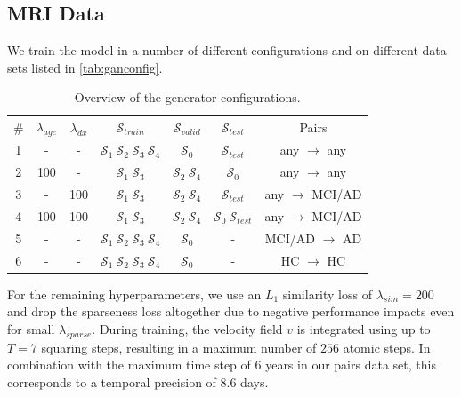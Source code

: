 \subsection{MRI Data} %

We train the model in a number of different configurations and on different data sets listed in \autoref{tab:ganconfig}.

\begin{table}[h]
	\begin{center}
		\begin{tabular}{c c c c c c c}
			\toprule
			\# & $\lambda_{age}$ & $\lambda_{dx}$ &
				$\mathcal{S}_{train}$ & $\mathcal{S}_{valid}$ & $\mathcal{S}_{test}$ & Pairs \\
			\cmidrule(lr){1-7}
			1 &  -  &  -  & $\mathcal{S}_1\:\mathcal{S}_2\:\mathcal{S}_3\:\mathcal{S}_4$ &
				      $\mathcal{S}_0$ &
				      $\mathcal{S}_{test}$ &
				      \footnotesize any $\rightarrow$ any \\
			2 & 100 &  -  & $\mathcal{S}_1\:\mathcal{S}_3$ & 
				      $\mathcal{S}_2\:\mathcal{S}_4$ &
				      $\mathcal{S}_0$ & 
				      \footnotesize any $\rightarrow$ any \\
			3 &  -  & 100 & $\mathcal{S}_1\:\mathcal{S}_3$ & 
				      $\mathcal{S}_2\:\mathcal{S}_4$ &
				      $\mathcal{S}_{test}$ & 
				      \footnotesize any $\rightarrow$ MCI/AD \\
			4 & 100 & 100 & $\mathcal{S}_1\:\mathcal{S}_3$ & 
				      $\mathcal{S}_2\:\mathcal{S}_4$ &
				      $\mathcal{S}_0\:\mathcal{S}_{test}$ &
				      \footnotesize any $\rightarrow$ MCI/AD \\
			5 &  -  &  -  & $\mathcal{S}_1\:\mathcal{S}_2\:\mathcal{S}_3\:\mathcal{S}_4$ &
				      $\mathcal{S}_0$ &
				      - &
				      \footnotesize MCI/AD $\rightarrow$ AD \\
			6 &  -  &  -  & $\mathcal{S}_1\:\mathcal{S}_2\:\mathcal{S}_3\:\mathcal{S}_4$ &
				      $\mathcal{S}_0$ &
				      - &
				      \footnotesize HC $\rightarrow$ HC \\
			\bottomrule
		\end{tabular}
		\caption{Overview of the generator configurations.}
		\label{tab:ganconfig}
	\end{center}
\end{table}

For the remaining hyperparameters, we use an $L_1$ similarity loss of $\lambda_{sim} = 200$ and drop the sparseness loss altogether due to negative performance impacts even for small $\lambda_{sparse}$. During training, the velocity field $v$ is integrated using up to $T = 7$ squaring steps, resulting in a maximum number of $256$ atomic steps. In combination with the maximum time step of 6 years in our pairs data set, this corresponds to a temporal precision of 8.6 days.

